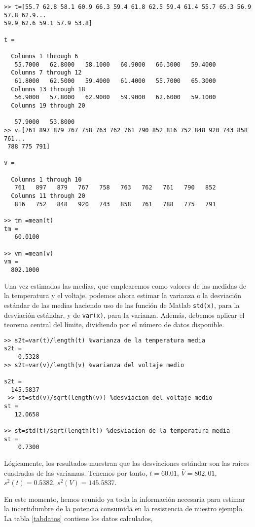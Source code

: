 \begin{itemize}
\begin{verbatim}
>> t=[55.7 62.8 58.1 60.9 66.3 59.4 61.8 62.5 59.4 61.4 55.7 65.3 56.9 57.8 62.9...
59.9 62.6 59.1 57.9 53.8]

t =

  Columns 1 through 6
   55.7000   62.8000   58.1000   60.9000   66.3000   59.4000
  Columns 7 through 12
   61.8000   62.5000   59.4000   61.4000   55.7000   65.3000
  Columns 13 through 18
   56.9000   57.8000   62.9000   59.9000   62.6000   59.1000
  Columns 19 through 20

   57.9000   53.8000
>> v=[761 897 879 767 758 763 762 761 790 852 816 752 848 920 743 858 761...
 788 775 791]

v =

  Columns 1 through 10
   761   897   879   767   758   763   762   761   790   852
  Columns 11 through 20
   816   752   848   920   743   858   761   788   775   791

>> tm =mean(t)
tm =
   60.0100

>> vm =mean(v)
vm =
  802.1000
\end{verbatim}

Una vez estimadas las medias, que emplearemos como valores de las medidas de la temperatura y el voltaje,  podemos ahora estimar la varianza o la desviación estándar de las medias haciendo uso de las función de Matlab \texttt{std(x)}, para la desviación estándar,  y de \texttt{var(x)}, para la varianza.  Además, debemos aplicar el teorema central del límite, dividiendo por el número de datos disponible.

\begin{verbatim}
>> s2t=var(t)/length(t) %varianza de la temperatura media
s2t =
    0.5328
>> s2t=var(v)/length(v) %varianza del voltaje medio

s2t =
  145.5837
 >> st=std(v)/sqrt(length(v)) %desviacion del voltaje medio
st =
   12.0658

>> st=std(t)/sqrt(length(t)) %desviacion de la temperatura media
st =
    0.7300
\end{verbatim} 

Lógicamente, los resultados muestran que las desviaciones estándar son las raíces cuadradas de las varianzas. Tenemos por tanto, $\bar{t}=60.01$, $\bar{V}=802,01$, $s^2(t)=0.5382$, $s^2(V)=145.5837$.

\end{itemize} 

En este momento, hemos reunido ya toda la información necesaria para estimar la incertidumbre de la potencia consumida en la resistencia de nuestro ejemplo. La tabla \ref{tabdatos} contiene los datos calculados,

